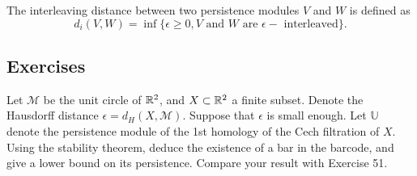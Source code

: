 \begin{definition}
    The interleaving distance between two persistence modules $V$ and $W$ is defined as
    $$d_i(V, W) = \inf\{\epsilon \ge 0, V \text{ and } W \text{ are }
    \epsilon-\text{ interleaved}\}.$$
\end{definition}

\subsection{Exercises}

\begin{exercise}
    Let $\mathcal{M}$ be the unit circle of $\mathbb{R}^2$, and $X \subset \mathbb{R}^2$ a
    finite subset. Denote the Hausdorff distance $\epsilon =
    d_H(X,\mathcal{M})$. Suppose that $\epsilon$ is small enough. Let
    $\mathbb{U}$ denote the persistence module of the 1st homology of the Cech
    filtration of $X$. Using the stability theorem, deduce the existence of a
    bar in the barcode, and give a lower bound on its persistence. Compare your result with Exercise 51.
\end{exercise}